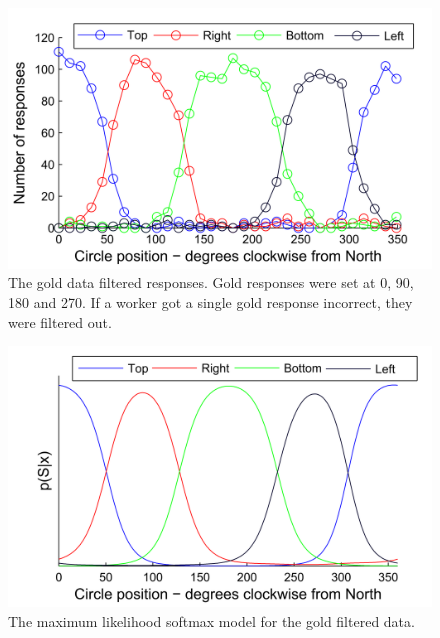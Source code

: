 \begin{figure}
	\centering
	\includegraphics[scale=1]{line_circular_gold_responses.png}
	\caption{The gold data filtered responses. Gold responses were set at 0, 90, 180 and 270. If a worker got a single gold response incorrect, they were filtered out.}
	\label{Figure:cicular_gold_responses}
\end{figure}


\begin{figure}
	\centering
	\includegraphics[scale=1]{line_circular_gold_softmax.png}
	\caption{The maximum likelihood softmax model for the gold filtered data.}
	\label{Figure:cicular_gold_softmax_model}
\end{figure}



